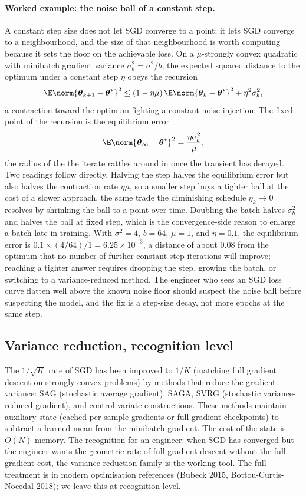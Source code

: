 \paragraph{Worked example: the noise ball of a constant step.}
A constant step size does not let SGD converge to a point; it lets
SGD converge to a neighbourhood, and the size of that neighbourhood is
worth computing because it sets the floor on the achievable loss. On a
$\mu$-strongly convex quadratic with minibatch gradient variance
$\sigma_{b}^{2} = \sigma^{2}/b$, the expected squared distance to the
optimum under a constant step $\eta$ obeys the recursion
\[
\E \norm{\boldsymbol{\theta}_{k+1} - \boldsymbol{\theta}^{*}}^{2}
\leq (1 - \eta \mu) \, \E \norm{\boldsymbol{\theta}_{k} -
\boldsymbol{\theta}^{*}}^{2} + \eta^{2} \sigma_{b}^{2},
\]
a contraction toward the optimum fighting a constant noise injection.
The fixed point of the recursion is the equilibrium error
\[
\E \norm{\boldsymbol{\theta}_{\infty} - \boldsymbol{\theta}^{*}}^{2}
= \frac{\eta \sigma_{b}^{2}}{\mu},
\]
the radius of the  the iterate rattles around in
once the transient has decayed. Two readings follow directly. Halving
the step halves the equilibrium error but also halves the contraction
rate $\eta \mu$, so a smaller step buys a tighter ball at the cost of a
slower approach, the same trade the diminishing schedule
$\eta_{k} \to 0$ resolves by shrinking the ball to a point over time.
Doubling the batch halves $\sigma_{b}^{2}$ and halves the ball at fixed
step, which is the convergence-side reason to enlarge a batch late in
training. With $\sigma^{2} = 4$, $b = 64$, $\mu = 1$, and $\eta = 0.1$,
the equilibrium error is $0.1 \times (4/64) / 1 = 6.25 \times 10^{-3}$,
a distance of about $0.08$ from the optimum that no number of further
constant-step iterations will improve; reaching a tighter answer
requires dropping the step, growing the batch, or switching to a
variance-reduced method. The engineer who sees an SGD loss curve
flatten well above the known noise floor should suspect the noise ball
before suspecting the model, and the fix is a step-size decay, not more
epochs at the same step.

\subsection{Variance reduction, recognition level}

The $1/\sqrt{K}$ rate of SGD has been improved to $1/K$ (matching
full gradient descent on strongly convex problems) by methods
that reduce the gradient variance: SAG (stochastic average
gradient), SAGA, SVRG (stochastic variance-reduced gradient), and
control-variate constructions. These methods maintain auxiliary
state (cached per-sample gradients or full-gradient checkpoints)
to subtract a learned mean from the minibatch gradient. The cost
of the state is $O(N)$ memory. The recognition for an engineer:
when SGD has converged but the engineer wants the geometric rate
of full gradient descent without the full-gradient cost, the
variance-reduction family is the working tool. The full
treatment is in modern optimisation references (Bubeck 2015,
Bottou-Curtis-Nocedal 2018); we leave this at recognition level.

